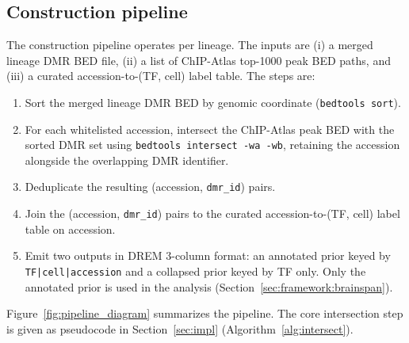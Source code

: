 \documentclass[sigconf,nonacm]{acmart}
\begin{document}
\subsection{Construction pipeline}
\label{sec:framework:pipeline}

The construction pipeline operates per lineage. The inputs are
(i) a merged lineage DMR BED file, (ii) a list of ChIP-Atlas
top-1000 peak BED paths, and (iii) a curated accession-to-(TF, cell)
label table. The steps are:

\begin{enumerate}
  \item Sort the merged lineage DMR BED by genomic coordinate
        (\texttt{bedtools sort}).
  \item For each whitelisted accession, intersect the
        ChIP-Atlas peak BED with the sorted DMR set using
        \texttt{bedtools intersect -wa -wb}, retaining the
        accession alongside the overlapping DMR identifier.
  \item Deduplicate the resulting (accession, \texttt{dmr\_id})
        pairs.
  \item Join the (accession, \texttt{dmr\_id}) pairs to the curated
        accession-to-(TF, cell) label table on accession.
  \item Emit two outputs in DREM 3-column format: an
        annotated prior keyed by \texttt{TF|cell|accession} and a
        collapsed prior keyed by TF only. Only the annotated prior
        is used in the analysis (Section~\ref{sec:framework:brainspan}).
\end{enumerate}

Figure~\ref{fig:pipeline_diagram} summarizes the pipeline. The core
intersection step is given as pseudocode in
Section~\ref{sec:impl} (Algorithm~\ref{alg:intersect}).
\end{document}
